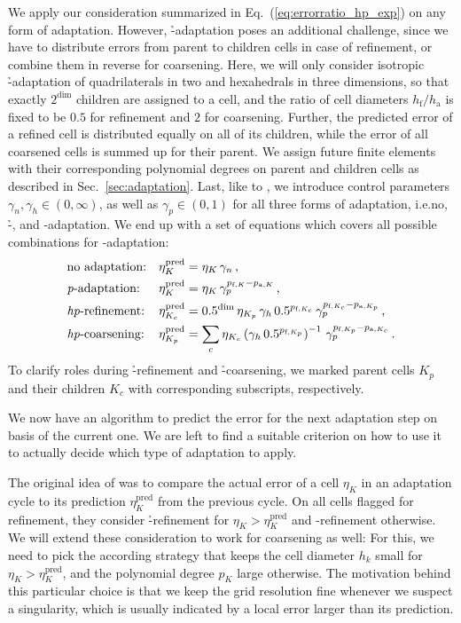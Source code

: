 We apply our consideration summarized in Eq.~(\ref{eq:errorratio_hp_exp}) on any form of adaptation. However, \h-adaptation poses an additional challenge, since we have to distribute errors from parent to children cells in case of refinement, or combine them in reverse for coarsening. Here, we will only consider isotropic \h-adaptation of quadrilaterals in two and hexahedrals in three dimensions, so that exactly $2^\text{dim}$ children are assigned to a cell, and the ratio of cell diameters $h_\text{f} / h_\text{a}$ is fixed to be $0.5$ for refinement and $2$ for coarsening. Further, the predicted error of a refined cell is distributed equally on all of its children, while the error of all coarsened cells is summed up for their parent. We assign future finite elements with their corresponding polynomial degrees on parent and children cells as described in Sec.~\ref{sec:adaptation}. Last, like to \textcite{melenk2001}, we introduce control parameters $\gamma_n, \gamma_h \in (0, \infty)$, as well as $\gamma_p \in (0,1)$ for all three forms of adaptation, i.e.\@ no, \h-, and \p-adaptation. We end up with a set of equations which covers all possible combinations for \hp-adaptation:
\begin{align}
&\text{no adaptation:} & \eta^\text{pred}_K &= \eta_K \, \gamma_n \,\text{,} \\
&\text{\textit{p}-adaptation:} & \eta^\text{pred}_K &= \eta_K \, \gamma_p^{p_{\text{f},K} - p_{\text{a},K}} \,\text{,} \\
&\text{\textit{hp}-refinement:} &\eta^\text{pred}_{K_c} &= 0.5^{\text{dim}} \, \eta_{K_p} \, \gamma_h \, 0.5^{p_{\text{f},K_c}} \, \gamma_p^{p_{\text{f},K_c} - p_{\text{a},K_p}} \,\text{,} \\
&\text{\textit{hp}-coarsening:} & \eta^\text{pred}_{K_p} &= \sum\limits_{c} \eta_{K_c} \left( \gamma_h \, 0.5^{p_{\text{f},K_p}} \right)^{-1} \, \gamma_p^{p_{\text{f},K_p} - p_{\text{a},K_c}} \,\text{.} 
\end{align}
To clarify roles during \h-refinement and \h-coarsening, we marked parent cells $K_p$ and their children $K_c$ with corresponding subscripts, respectively.

We now have an algorithm to predict the error for the next adaptation step on basis of the current one. We are left to find a suitable criterion on how to use it to actually decide which type of adaptation to apply.

The original idea of \cite{melenk2001} was to compare the actual error of a cell $\eta_K$ in an adaptation cycle to its prediction $\eta_K^\text{pred}$ from the previous cycle. On all cells flagged for refinement, they consider \h-refinement for $\eta_K > \eta_K^\text{pred}$ and \p-refinement otherwise. We will extend these consideration to work for coarsening as well: For this, we need to pick the according strategy that keeps the cell diameter $h_k$ small for $\eta_K > \eta_K^\text{pred}$, and the polynomial degree $p_K$ large otherwise. The motivation behind this particular choice is that we keep the grid resolution fine whenever we suspect a singularity, which is usually indicated by a local error larger than its prediction.

